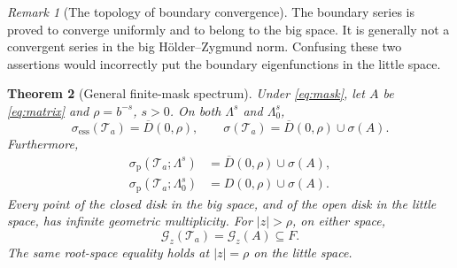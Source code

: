\documentclass[11pt,a4paper]{article}
\numberwithin{equation}{section}
\newtheorem{theorem}{Theorem}[section]
\theoremstyle{definition}
\theoremstyle{remark}
\newtheorem{remark}[theorem]{Remark}
\newcommand{\Ta}{\mathcal T_a}
\newcommand{\ess}{\mathrm{ess}}
\newcommand{\pt}{\mathrm p}
\newcommand{\disk}[1]{\overline{D}(0,#1)}
\newcommand{\openD}[1]{D(0,#1)}
\newcommand{\Gg}[2]{\mathcal G_{#1}(#2)}
\newcommand{\smallspace}{\Lambda_0}
\begin{document}
\begin{remark}[The topology of boundary convergence]
The boundary series is proved to converge uniformly and to belong to
the big space. It is generally not a convergent series in the big
H\"older--Zygmund norm. Confusing these two assertions would incorrectly
put the boundary eigenfunctions in the little space.
\end{remark}

\begin{theorem}[General finite-mask spectrum]
\label{thm:general-spectrum}
Under \eqref{eq:mask}, let $A$ be \eqref{eq:matrix} and
$\rho=b^{-s}$, $s>0$. On both $\Lambda^s$ and $\smallspace^s$,
\begin{equation}
 \sigma_{\ess}(\Ta)=\disk\rho,
 \qquad \sigma(\Ta)=\disk\rho\cup\sigma(A).
 \label{eq:general-spectrum}
\end{equation}
Furthermore,
\begin{align}
 \sigma_{\pt}(\Ta;\Lambda^s)&=\disk\rho\cup\sigma(A),\\
 \sigma_{\pt}(\Ta;\smallspace^s)&=\openD\rho\cup\sigma(A).
 \label{eq:general-points}
\end{align}
Every point of the closed disk in the big space, and of the open disk
in the little space, has infinite geometric multiplicity. For
$|z|>\rho$, on either space,
\begin{equation}
 \Gg z{\Ta}=\Gg zA\subseteq F.
 \label{eq:exterior-roots}
\end{equation}
The same root-space equality holds at $|z|=\rho$ on the little space.
\end{theorem}
\end{document}

